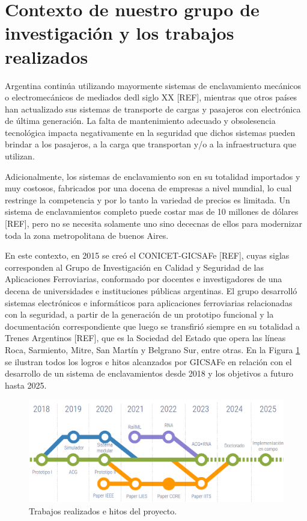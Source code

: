 \section{Contexto de nuestro grupo de investigación y los trabajos realizados}

    Argentina continúa utilizando mayormente sistemas de enclavamiento mecánicos o electromecánicos de mediados dedl siglo XX [REF], mientras que otros países han actualizado sus sistemas de transporte de cargas y pasajeros con electrónica de última generación. La falta de mantenimiento adecuado y obsolesencia tecnológica impacta negativamente en la seguridad que dichos sistemas pueden brindar a los pasajeros, a la carga que transportan y/o a la infraestructura que utilizan.

    Adicionalmente, los sistemas de enclavamiento son en su totalidad importados y muy costosos, fabricados por una docena de empresas a nivel mundial, lo cual restringe la competencia y por lo tanto la variedad de precios es limitada. Un sistema de enclavamientos completo puede costar mas de 10 millones de dólares [REF], pero no se necesita solamente uno sino dececnas de ellos para modernizar toda la zona metropolitana de buenos Aires.

    En este contexto, en 2015 se creó el CONICET-GICSAFe [REF], cuyas siglas corresponden al Grupo de Investigación en Calidad y Seguridad de las Aplicaciones Ferroviarias, conformado por docentes e investigadores de una decena de universidades e instituciones públicas argentinas. El grupo desarrolló sistemas electrónicos e informáticos para aplicaciones ferroviarias relacionadas con la seguridad, a partir de la generación de un prototipo funcional y la documentación correspondiente que luego se transfirió siempre en su totalidad a Trenes Argentinos [REF], que es la Sociedad del Estado que opera las líneas Roca, Sarmiento, Mitre, San Martín y Belgrano Sur, entre otras. En la Figura \ref{fig:contexto} se ilustran todos los logros e hitos alcanzados por GICSAFe en relación con el desarrollo de un sistema de enclavamientos desde 2018 y los objetivos a futuro hasta 2025.

    \begin{figure}[h]
        \centering
        \includegraphics[width=1\textwidth]{Figuras/HojaDeRuta}
        \centering\caption{Trabajos realizados e hitos del proyecto.}
        \label{fig:contexto}
    \end{figure}

